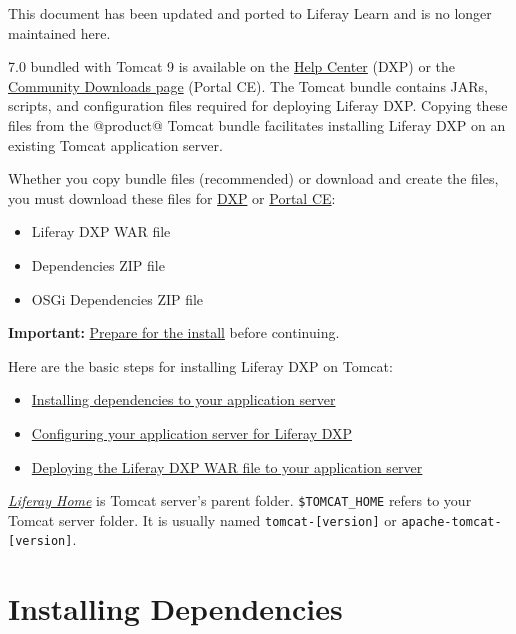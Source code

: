 {This document has been updated and ported to Liferay Learn and is no
longer maintained here.}

7.0 bundled with Tomcat 9 is available on the
\href{https://customer.liferay.com/downloads}{Help Center} (DXP) or the
\href{https://www.liferay.com/downloads-community}{Community Downloads
page} (Portal CE). The Tomcat bundle contains JARs, scripts, and
configuration files required for deploying Liferay DXP. Copying these
files from the @product@ Tomcat bundle facilitates installing Liferay
DXP on an existing Tomcat application server.

Whether you copy bundle files (recommended) or download and create the
files, you must download these files for
\href{https://customer.liferay.com/downloads}{DXP} or
\href{https://www.liferay.com/downloads-community}{Portal CE}:

\begin{itemize}
\tightlist
\item
  Liferay DXP WAR file
\item
  Dependencies ZIP file
\item
  OSGi Dependencies ZIP file
\end{itemize}

\noindent\hrulefill

\textbf{Important:}
\href{/docs/7-2/deploy/-/knowledge_base/d/preparing-for-install}{Prepare
for the install} before continuing.

\noindent\hrulefill

Here are the basic steps for installing Liferay DXP on Tomcat:

\begin{itemize}
\tightlist
\item
  \hyperref[installing-dependencies]{Installing dependencies to your
  application server}
\item
  \hyperref[configuring-tomcat]{Configuring your application server for
  Liferay DXP}
\item
  \hyperref[deploying-product]{Deploying the Liferay DXP WAR file to
  your application server}
\end{itemize}

\href{/docs/7-2/deploy/-/knowledge_base/d/liferay-home}{\emph{Liferay
Home}} is Tomcat server's parent folder. \texttt{\$TOMCAT\_HOME} refers
to your Tomcat server folder. It is usually named
\texttt{tomcat-{[}version{]}} or \texttt{apache-tomcat-{[}version{]}}.

\section{Installing Dependencies}\label{installing-dependencies}

